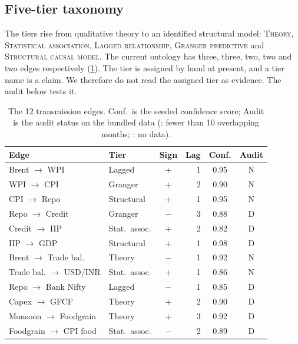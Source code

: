 \documentclass[conference]{IEEEtran}
\newcommand{\code}[1]{\texttt{\detokenize{#1}}}
\begin{document}
\subsection{Five-tier taxonomy}
The tiers rise from qualitative theory to an identified structural model: \textsc{Theory}, \textsc{Statistical association}, \textsc{Lagged relationship}, \textsc{Granger predictive} and \textsc{Structural causal model}. The current ontology has three, three, two, two and two edges respectively (\cref{tab:edges}). The tier is assigned by hand at present, and a tier name is a claim. We therefore do not read the assigned tier as evidence. The audit below tests it.

\begin{table}[t]
\centering
\caption{The 12 transmission edges. Conf.\ is the seeded confidence score; Audit is the audit status on the bundled data (\code{N}: fewer than 10 overlapping months; \code{D}: no data).}
\label{tab:edges}
\footnotesize
\setlength{\tabcolsep}{3.2pt}
\begin{tabular}{@{}llcrcc@{}}
\toprule
\textbf{Edge} & \textbf{Tier} & \textbf{Sign} & \textbf{Lag} & \textbf{Conf.} & \textbf{Audit} \\
\midrule
Brent $\to$ WPI & Lagged & $+$ & 1 & 0.95 & N \\
WPI $\to$ CPI & Granger & $+$ & 2 & 0.90 & N \\
CPI $\to$ Repo & Structural & $+$ & 1 & 0.95 & N \\
Repo $\to$ Credit & Granger & $-$ & 3 & 0.88 & D \\
Credit $\to$ IIP & Stat.\ assoc. & $+$ & 2 & 0.82 & D \\
IIP $\to$ GDP & Structural & $+$ & 1 & 0.98 & D \\
Brent $\to$ Trade bal. & Theory & $-$ & 1 & 0.92 & N \\
Trade bal. $\to$ USD/INR & Stat.\ assoc. & $+$ & 1 & 0.86 & N \\
Repo $\to$ Bank Nifty & Lagged & $-$ & 1 & 0.85 & D \\
Capex $\to$ GFCF & Theory & $+$ & 2 & 0.90 & D \\
Monsoon $\to$ Foodgrain & Theory & $+$ & 3 & 0.92 & D \\
Foodgrain $\to$ CPI food & Stat.\ assoc. & $-$ & 2 & 0.89 & D \\
\bottomrule
\end{tabular}
\end{table}
\end{document}
